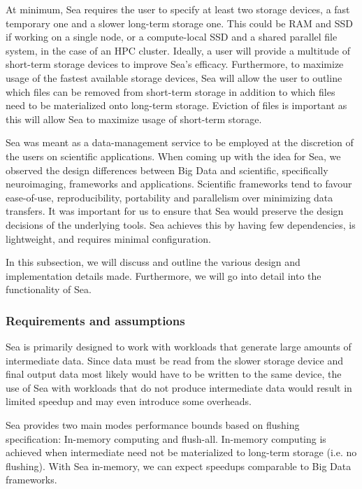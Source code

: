 At minimum, Sea requires the user to specify at least two storage devices, a
fast temporary one and a slower long-term storage one. This could be RAM and SSD
if working on a single node, or a compute-local SSD and a shared parallel file
system, in the case of an HPC cluster. Ideally, a user will provide a multitude
of short-term storage devices to improve Sea's efficacy. Furthermore, to
maximize usage of the fastest available storage devices, Sea will allow the user
to outline which files can be removed from short-term storage in addition to
which files need to be materialized onto long-term storage. Eviction of files is
important as this will allow Sea to maximize usage of short-term storage.


Sea was meant as a data-management service to be employed at the discretion of
the users on scientific applications. When coming up with the idea for Sea, we
observed the design differences between Big Data and scientific, specifically
neuroimaging, frameworks and applications. Scientific frameworks tend to favour
ease-of-use, reproducibility, portability and parallelism over minimizing data
transfers. It was important for us to ensure that Sea would preserve the design
decisions of the underlying tools. Sea achieves this by having few dependencies,
is lightweight, and requires minimal configuration.


In this subsection, we will discuss and outline the various design and
implementation details made. Furthermore, we will go into detail into the
functionality of Sea.

\subsubsection{Requirements and assumptions}

Sea is primarily designed to work with workloads that generate large amounts of
intermediate data. Since data must be read from the slower storage device and
final output data most likely would have to be written to the same device, the
use of Sea with workloads that do not produce intermediate data would result in
limited speedup and may even introduce some overheads. 

Sea provides two main modes performance bounds based on flushing specification:
In-memory computing and flush-all. In-memory computing is achieved when
intermediate need not be materialized to long-term storage (i.e. no flushing).
With Sea in-memory, we can expect speedups comparable to Big Data frameworks.


